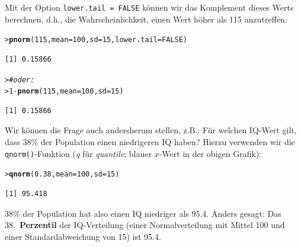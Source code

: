 \documentclass[oneside, 10pt]{book}\usepackage[]{graphicx}\usepackage[]{xcolor}
\makeatletter
\newcommand{\hlnum}[1]{\textcolor[rgb]{0.686,0.059,0.569}{#1}}%
\newcommand{\hlcom}[1]{\textcolor[rgb]{0.678,0.584,0.686}{\textit{#1}}}%
\newcommand{\hlopt}[1]{\textcolor[rgb]{0,0,0}{#1}}%
\newcommand{\hlstd}[1]{\textcolor[rgb]{0.345,0.345,0.345}{#1}}%
\newcommand{\hlkwc}[1]{\textcolor[rgb]{0.333,0.667,0.333}{#1}}%
\newcommand{\hlkwd}[1]{\textcolor[rgb]{0.737,0.353,0.396}{\textbf{#1}}}%
\newenvironment{kframe}{%
 \def\at@end@of@kframe{}%
 \ifinner\ifhmode%
  \def\at@end@of@kframe{\end{minipage}}%
  \begin{minipage}{\columnwidth}%
 \fi\fi%
 \def\FrameCommand##1{\hskip\@totalleftmargin \hskip-\fboxsep
 \colorbox{shadecolor}{##1}\hskip-\fboxsep
     \hskip-\linewidth \hskip-\@totalleftmargin \hskip\columnwidth}%
 \MakeFramed {\advance\hsize-\width
   \@totalleftmargin\z@ \linewidth\hsize
   \@setminipage}}%
 {\par\unskip\endMakeFramed%
 \at@end@of@kframe}
\newenvironment{knitrout}{}{} %
\makeatother
\begin{document}
Mit der Option \texttt{lower.tail = FALSE} können wir das Komplement
dieses Werts berechnen, d.h., die Wahrscheinlichkeit, einen Wert höher
als 115 anzutreffen:
\begin{knitrout}
\color{fgcolor}\begin{kframe}
\begin{alltt}
\hlstd{> }\hlkwd{pnorm}\hlstd{(}\hlnum{115}\hlstd{,} \hlkwc{mean} \hlstd{=} \hlnum{100}\hlstd{,} \hlkwc{sd} \hlstd{=} \hlnum{15}\hlstd{,} \hlkwc{lower.tail} \hlstd{=} \hlnum{FALSE}\hlstd{)}
\end{alltt}
\begin{verbatim}
[1] 0.15866
\end{verbatim}
\begin{alltt}
\hlstd{> }\hlcom{# oder:}
\hlstd{> }\hlnum{1} \hlopt{-} \hlkwd{pnorm}\hlstd{(}\hlnum{115}\hlstd{,} \hlkwc{mean} \hlstd{=} \hlnum{100}\hlstd{,} \hlkwc{sd} \hlstd{=} \hlnum{15}\hlstd{)}
\end{alltt}
\begin{verbatim}
[1] 0.15866
\end{verbatim}
\end{kframe}
\end{knitrout}

Wir können die Frage auch andersherum stellen,
z.B.: Für welchen IQ-Wert gilt, dass 38\% der Population einen
niedrigeren IQ haben? Hierzu verwenden wir die
\texttt{qnorm()}-Funktion (\textit{q} für \textit{quantile};
blauer $x$-Wert in der obigen Grafik):
\begin{knitrout}
\color{fgcolor}\begin{kframe}
\begin{alltt}
\hlstd{> }\hlkwd{qnorm}\hlstd{(}\hlnum{0.38}\hlstd{,} \hlkwc{mean} \hlstd{=} \hlnum{100}\hlstd{,} \hlkwc{sd} \hlstd{=} \hlnum{15}\hlstd{)}
\end{alltt}
\begin{verbatim}
[1] 95.418
\end{verbatim}
\end{kframe}
\end{knitrout}

38\% der Population hat also einen IQ niedriger als 95.4.
Anders gesagt: Das 38.\ \textbf{Perzentil} der IQ-Verteilung
(einer Normalverteilung mit Mittel 100 und einer Standardabweichung von 15) ist 95.4.
\end{document}

